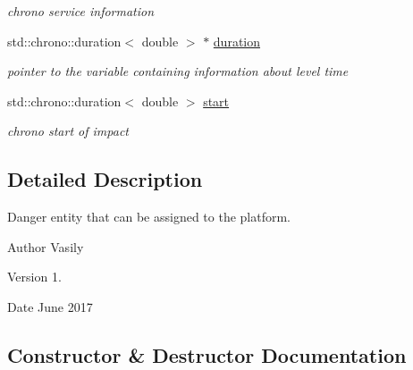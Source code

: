 \begin{DoxyCompactItemize}
\begin{DoxyCompactList}\small\item\em chrono service information \end{DoxyCompactList}\item 
\mbox{\label{class_danger_object_a4bb9e8dffdc1815094e867824ea4e393}} 
std\+::chrono\+::duration$<$ double $>$ $\ast$ \hyperlink{class_danger_object_a4bb9e8dffdc1815094e867824ea4e393}{duration}
\begin{DoxyCompactList}\small\item\em pointer to the variable containing information about level time \end{DoxyCompactList}\item 
\mbox{\label{class_danger_object_aa56801b799fc9193bb3ae64c400aa614}} 
std\+::chrono\+::duration$<$ double $>$ \hyperlink{class_danger_object_aa56801b799fc9193bb3ae64c400aa614}{start}
\begin{DoxyCompactList}\small\item\em chrono start of impact \end{DoxyCompactList}\end{DoxyCompactItemize}


\subsection{Detailed Description}
Danger entity that can be assigned to the platform. 

\begin{DoxyAuthor}{Author}
Vasily 
\end{DoxyAuthor}
\begin{DoxyVersion}{Version}
1. 
\end{DoxyVersion}
\begin{DoxyDate}{Date}
June 2017 
\end{DoxyDate}


\subsection{Constructor \& Destructor Documentation}
\mbox{\label{class_danger_object_a87186516066d7d47dcea87eec44ee616}} 
